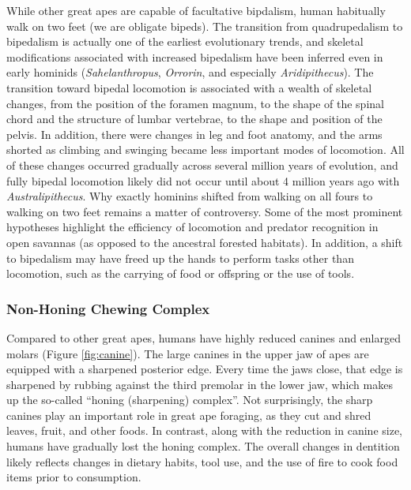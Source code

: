 \documentclass[
]{book}
\begin{document}
While other great apes are capable of facultative bipdalism, human habitually walk on two feet (we are obligate bipeds). The transition from quadrupedalism to bipedalism is actually one of the earliest evolutionary trends, and skeletal modifications associated with increased bipedalism have been inferred even in early hominids (\emph{Sahelanthropus}, \emph{Orrorin}, and especially \emph{Aridipithecus}). The transition toward bipedal locomotion is associated with a wealth of skeletal changes, from the position of the foramen magnum, to the shape of the spinal chord and the structure of lumbar vertebrae, to the shape and position of the pelvis. In addition, there were changes in leg and foot anatomy, and the arms shorted as climbing and swinging became less important modes of locomotion. All of these changes occurred gradually across several million years of evolution, and fully bipedal locomotion likely did not occur until about 4 million years ago with \emph{Australipithecus}. Why exactly hominins shifted from walking on all fours to walking on two feet remains a matter of controversy. Some of the most prominent hypotheses highlight the efficiency of locomotion and predator recognition in open savannas (as opposed to the ancestral forested habitats). In addition, a shift to bipedalism may have freed up the hands to perform tasks other than locomotion, such as the carrying of food or offspring or the use of tools.

\hypertarget{non-honing-chewing-complex}{%
\subsubsection*{Non-Honing Chewing Complex}\label{non-honing-chewing-complex}}

Compared to other great apes, humans have highly reduced canines and enlarged molars (Figure \ref{fig:canine}). The large canines in the upper jaw of apes are equipped with a sharpened posterior edge. Every time the jaws close, that edge is sharpened by rubbing against the third premolar in the lower jaw, which makes up the so-called ``honing (sharpening) complex''. Not surprisingly, the sharp canines play an important role in great ape foraging, as they cut and shred leaves, fruit, and other foods. In contrast, along with the reduction in canine size, humans have gradually lost the honing complex. The overall changes in dentition likely reflects changes in dietary habits, tool use, and the use of fire to cook food items prior to consumption.
\end{document}
